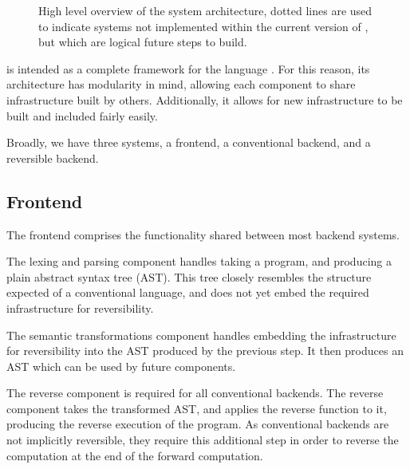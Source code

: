 \begin{center}
\begin{figure}[hbt!]
{
}
\caption{High level overview of the system architecture, dotted lines are used to indicate systems not implemented within the current version of \rimp, but which are logical future steps to build.}
\label{fig:system_architecture}
\end{figure}
\end{center}

\rimp is intended as a complete framework for the language \rimplang. For this reason, its architecture has modularity in mind, allowing each component to share infrastructure built by others. Additionally, it allows for new infrastructure to be built and included fairly easily.

Broadly, we have three systems, a frontend, a conventional backend, and a reversible backend.

\subsection{Frontend}

The frontend comprises the functionality shared between most backend systems. 

The lexing and parsing component handles taking a \rimplang program, and producing a plain abstract syntax tree (AST). This tree closely resembles the structure expected of a conventional language, and does not yet embed the required infrastructure for reversibility.

The semantic transformations component handles embedding the infrastructure for reversibility into the AST produced by the previous step. It then produces an AST which can be used by future components.

The reverse component is required for all conventional backends. The reverse component takes the transformed AST, and applies the reverse function to it, producing the reverse execution of the program. As conventional backends are not implicitly reversible, they require this additional step in order to reverse the computation at the end of the forward computation.

